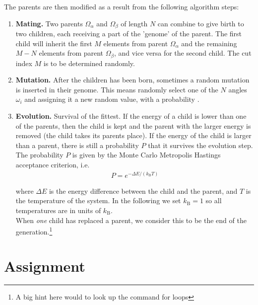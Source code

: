 \documentclass{article}
\begin{document}
The parents are then modified as a result from the following algorithm steps:

\begin{enumerate}

    \item {\bf Mating.}\newline
        Two parents $\Omega_\alpha$ and $\Omega_\beta$ of length $N$ can combine to give birth to two children, each receiving a part of the 'genome' of the parent.
        The first child will inherit the first $M$ elements from parent $\Omega_\alpha$ and the remaining $M-N$ elements from parent $\Omega_\beta$, and vice versa for the second child.
        The cut index $M$ is to be determined randomly.

    \item {\bf Mutation.}\newline
        After the children has been born, sometimes a random mutation is inserted in their genome.
        This means randomly select one of the $N$ angles $\omega_i$ and assigning it a new random value, with a probability .

    \item {\bf Evolution.} \newline
        Survival of the fittest.
        If the energy of a child is lower than one of the parents, then the child is kept and the parent with the larger energy is removed (the child takes its parents place).
        If the energy of the child is larger than a parent, there is still a probability $P$ that it survives the evolution step.           The probability $P$ is given by the Monte Carlo Metropolis Hastings acceptance criterion, i.e.
        \begin{align}
        P = e^{-\Delta E /(k_\mathrm{B}T)}
        \end{align}

        where $\Delta E$ is the energy difference between the child and the parent, and $T$ is the temperature of the system.
        In the following we set $k_\mathrm{B} = 1$ so all temperatures are in units of  $k_\mathrm{B}$.\\
        When {\em one} child has replaced a parent, we consider this to be the end of the generation.\footnote{A big hint here would to look up the  command for loops}

\end{enumerate}


\newpage
\section{Assignment}
\end{document}
